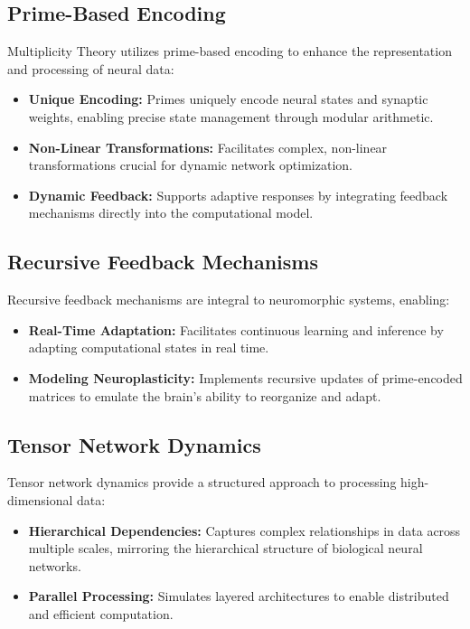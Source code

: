 \documentclass{article}
\theoremstyle{plain}
\begin{document}
\subsection{Prime-Based Encoding}
Multiplicity Theory utilizes prime-based encoding to enhance the representation and processing of neural data:
\begin{itemize}
    \item \textbf{Unique Encoding:} Primes uniquely encode neural states and synaptic weights, enabling precise state management through modular arithmetic.
    \item \textbf{Non-Linear Transformations:} Facilitates complex, non-linear transformations crucial for dynamic network optimization.
    \item \textbf{Dynamic Feedback:} Supports adaptive responses by integrating feedback mechanisms directly into the computational model.
\end{itemize}

\subsection{Recursive Feedback Mechanisms}
Recursive feedback mechanisms are integral to neuromorphic systems, enabling:
\begin{itemize}
    \item \textbf{Real-Time Adaptation:} Facilitates continuous learning and inference by adapting computational states in real time.
    \item \textbf{Modeling Neuroplasticity:} Implements recursive updates of prime-encoded matrices to emulate the brain's ability to reorganize and adapt.
\end{itemize}

\subsection{Tensor Network Dynamics}
Tensor network dynamics provide a structured approach to processing high-dimensional data:
\begin{itemize}
    \item \textbf{Hierarchical Dependencies:} Captures complex relationships in data across multiple scales, mirroring the hierarchical structure of biological neural networks.
    \item \textbf{Parallel Processing:} Simulates layered architectures to enable distributed and efficient computation.
\end{itemize}
\end{document}
